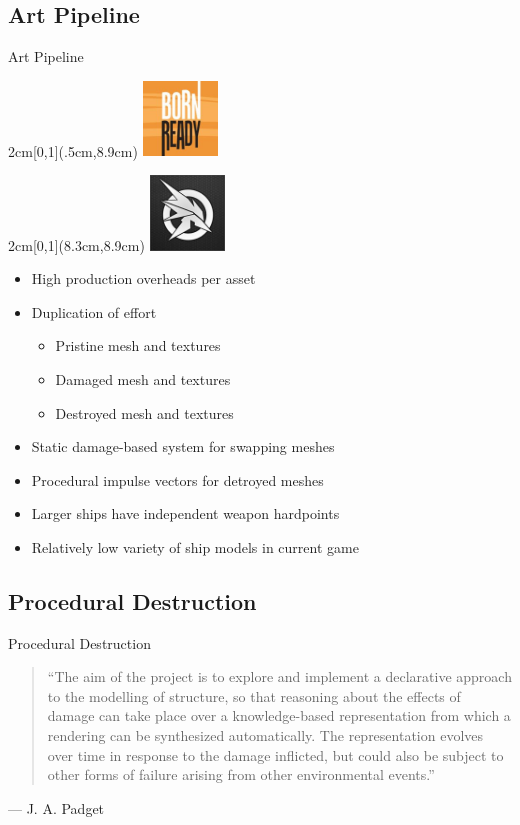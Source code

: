 \documentclass[t]{beamer}
\begin{document}
	\subsection{Art Pipeline}
		\begin{frame}{Art Pipeline}
			\begin{textblock*}{2cm}[0,1](.5cm,8.9cm) %
			\includegraphics[width=2cm]{bornready.jpg}
			\end{textblock*}
			\begin{textblock*}{2cm}[0,1](8.3cm,8.9cm) %
			\includegraphics[width=2cm]{strikesuitzero.jpg}
			\end{textblock*}
			\begin{itemize}
				\item High production overheads per asset
				\item Duplication of effort
				\begin{itemize}
					\item Pristine mesh and textures
					\item Damaged mesh and textures
					\item Destroyed mesh and textures
				\end{itemize}
				\item Static damage-based system for swapping meshes
				\item Procedural impulse vectors for detroyed meshes
				\item Larger ships have independent weapon hardpoints
				\item Relatively low variety of ship models in current game
			\end{itemize}
		
		\end{frame}


	\subsection{Procedural Destruction}
		\begin{frame}{Procedural Destruction}
		\begin{quote} \footnotesize
		``The aim of the project is to explore and implement a declarative approach to the modelling of structure, so that reasoning about the effects of damage can take place over a knowledge-based representation from which a rendering can be synthesized automatically.  The representation evolves over time in response to the damage inflicted, but could also be subject to other forms of failure arising from other environmental events.''
		\end{quote}
		\hfill --- J. A. Padget
		\end{frame}
\end{document}
